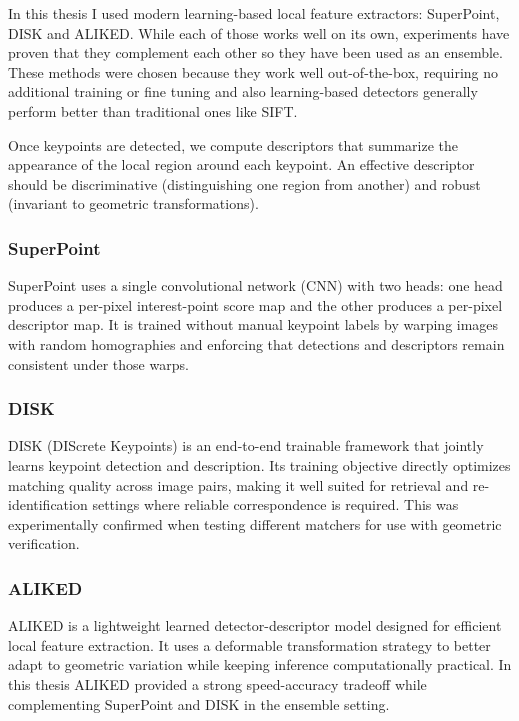 In this thesis I used modern learning-based local feature extractors: SuperPoint\cite{DeTone2018SuperPoint}, DISK\cite{tyszkiewicz2020disklearninglocalfeatures} and ALIKED\cite{zhao2023alikedlighterkeypointdescriptor}. While each of those works well on its own, experiments have proven that they complement each other so they have been used as an ensemble. These methods were chosen because they work well out-of-the-box, requiring no additional training or fine tuning and also learning-based detectors generally perform better than traditional ones like SIFT.\cite{Lowe2004SIFT} 

Once keypoints are detected, we compute descriptors that summarize the appearance of the local region around each keypoint. An effective descriptor should be discriminative (distinguishing one region from another) and robust (invariant to geometric transformations).

\subsubsection{SuperPoint}
SuperPoint\cite{DeTone2018SuperPoint} uses a single convolutional network (CNN) with two heads: one head produces a per-pixel interest-point score map and the other produces a per-pixel descriptor map. It is trained without manual keypoint labels by warping images with random homographies and enforcing that detections and descriptors remain consistent under those warps.

\subsubsection{DISK}
DISK (DIScrete Keypoints)\cite{tyszkiewicz2020disklearninglocalfeatures} is an end-to-end trainable framework that jointly learns keypoint detection and description. Its training objective directly optimizes matching quality across image pairs, making it well suited for retrieval and re-identification settings where reliable correspondence is required. This was experimentally confirmed when testing different matchers for use with geometric verification. 

\subsubsection{ALIKED}
ALIKED\cite{zhao2023alikedlighterkeypointdescriptor} is a lightweight learned detector-descriptor model designed for efficient local feature extraction. It uses a deformable transformation strategy to better adapt to geometric variation while keeping inference computationally practical. In this thesis ALIKED provided a strong speed-accuracy tradeoff while complementing SuperPoint and DISK in the ensemble setting. 


